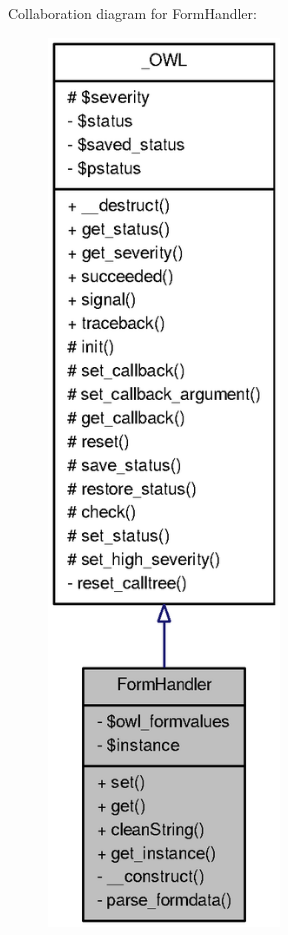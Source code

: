 Collaboration diagram for FormHandler:\nopagebreak
\begin{figure}[H]
\begin{center}
\leavevmode
\includegraphics[width=174pt]{classFormHandler__coll__graph}
\end{center}
\end{figure}
